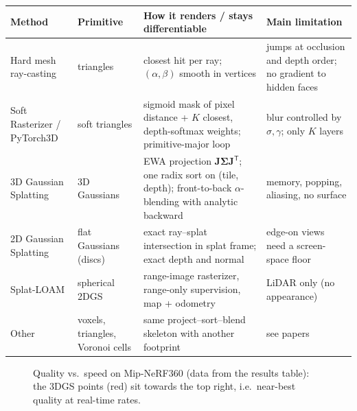 \documentclass[11pt,a4paper]{article}
\newcommand{\T}{^{\mathsf T}}
\theoremstyle{definition}
\theoremstyle{algstyle}
\theoremstyle{plain}
\theoremstyle{remark}
\begin{document}
\begin{center}
\small
\renewcommand{\arraystretch}{1.25}
\begin{tabularx}{\linewidth}{@{}p{2.45cm}p{2.3cm}XX@{}}
\toprule
Method & Primitive & How it renders / stays differentiable & Main limitation \\ \midrule
Hard mesh ray-casting & triangles & closest hit per ray; $(\alpha,\beta)$ smooth in vertices & jumps at occlusion and depth order; no gradient to hidden faces \\
Soft Rasterizer / PyTorch3D & soft triangles & sigmoid mask of pixel distance + $K$ closest, depth-softmax weights; primitive-major loop & blur controlled by $\sigma,\gamma$; only $K$ layers \\
3D Gaussian Splatting & 3D Gaussians & EWA projection $\bm J\bm\Sigma\bm J\T$; one radix sort on (tile, depth); front-to-back $\alpha$-blending with analytic backward & memory, popping, aliasing, no surface \\
2D Gaussian Splatting & flat Gaussians (discs) & exact ray--splat intersection in splat frame; exact depth and normal & edge-on views need a screen-space floor \\
Splat-LOAM & spherical 2DGS & range-image rasterizer, range-only supervision, map + odometry & LiDAR only (no appearance) \\
Other & voxels, triangles, Voronoi cells & same project--sort--blend skeleton with another footprint & see papers \\ \bottomrule
\end{tabularx}
\end{center}

\begin{figure}[htbp]
\centering
{}
\caption{Quality vs.\ speed on Mip-NeRF360 (data from the results table): the 3DGS points (red) sit towards the top right, i.e.\ near-best quality at real-time rates.}
\end{figure}
\end{document}
